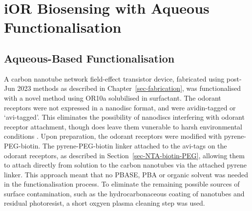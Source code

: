 \documentclass[
  a4paper,
]{scrbook}
\begin{document}
\hypertarget{ior-biosensing-with-aqueous-functionalisation}{%
\section{iOR Biosensing with Aqueous
Functionalisation}\label{ior-biosensing-with-aqueous-functionalisation}}

\hypertarget{aqueous-based-functionalisation}{%
\subsection{Aqueous-Based
Functionalisation}\label{aqueous-based-functionalisation}}

A carbon nanotube network field-effect transistor device, fabricated
using post-Jun 2023 methods as described in
Chapter~\ref{sec-fabrication}, was functionalised with a novel method
using OR10a solubilised in surfactant. The odorant receptors were not
expressed in a nanodisc format, and were avidin-tagged or `avi-tagged'.
This eliminates the possibility of nanodiscs interfering with odorant
receptor attachment, though does leave them vunerable to harsh
environmental conditions \autocite{Nath2007,Bayburt2010}. Upon
preparation, the odorant receptors were modified with pyrene-PEG-biotin.
The pyrene-PEG-biotin linker attached to the avi-tags on the odorant
receptors, as described in Section~\ref{sec-NTA-biotin-PEG}, allowing
them to attach directly from solution to the carbon nanotubes via the
attached pyrene linker. This approach meant that no PBASE, PBA or
organic solvent was needed in the functionalisation process. To
eliminate the remaining possible sources of surface contamination, such
as the hydrocarbonaceous coating of nanotubes and residual photoresist,
a short oxgyen plasma cleaning step was used.
\end{document}
